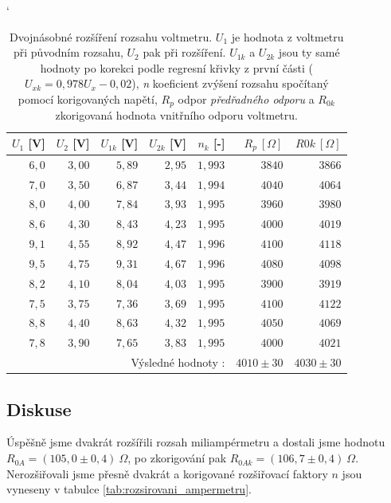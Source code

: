 \documentclass[english]{article}
\begin{document}
\begin{table}[h]
\catcode` %
\begin{center}
\begin{tabular}{|r|r|r|r|r|r|r|}
\hline
     $U_1$ [V] & $U_2$ [V] & $U_{1k}$ [V] & $U_{2k}$ [V] & $n_k$ [-] & $R_p\ [\Omega]$  & $R0k\ [\Omega]$  \\ \hline
     $6,0$ & $3,00$ & $5,89$ & $2,95$ & $1,993$ & $3840$ & $3866$ \\ \hline
     $7,0$ & $3,50$ & $6,87$ & $3,44$ & $1,994$ & $4040$ & $4064$ \\ \hline
     $8,0$ & $4,00$ & $7,84$ & $3,93$ & $1,995$ & $3960$ & $3980$ \\ \hline
     $8,6$ & $4,30$ & $8,43$ & $4,23$ & $1,995$ & $4000$ & $4019$ \\ \hline
     $9,1$ & $4,55$ & $8,92$ & $4,47$ & $1,996$ & $4100$ & $4118$ \\ \hline
     $9,5$ & $4,75$ & $9,31$ & $4,67$ & $1,996$ & $4080$ & $4098$ \\ \hline
     $8,2$ & $4,10$ & $8,04$ & $4,03$ & $1,995$ & $3900$ & $3919$ \\ \hline
     $7,5$ & $3,75$ & $7,36$ & $3,69$ & $1,995$ & $4100$ & $4122$ \\ \hline
     $8,8$ & $4,40$ & $8,63$ & $4,32$ & $1,995$ & $4050$ & $4069$ \\ \hline
     $7,8$ & $3,90$ & $7,65$ & $3,83$ & $1,995$ & $4000$ & $4021$ \\ \hline
      
      \multicolumn{2}{r|}{} & \multicolumn{3}{|r|}{Výsledné hodnoty \cite{bib:pra_chyby_o_2}:}  & $4010 \pm 30$  & $4030 \pm 30$ \\ 
      \cline{3-7} %
      
\end{tabular}
\caption{Dvojnásobné rozšíření rozsahu voltmetru. $U_1$ je hodnota z voltmetru při původním rozsahu, $U_2$ pak při rozšíření. $U_{1k}$ a $U_{2k}$ jsou ty samé hodnoty po korekci podle regresní křivky z první části ($U_{xk} = 0,978 U_x - 0,02$), \emph{n} koeficient zvýšení rozsahu spočítaný pomocí korigovaných napětí, $R_p$ odpor \emph{předřadného odporu} a $R_{0k}$ zkorigovaná hodnota vnitřního odporu voltmetru.} 
\label{tab:rozsirovani_voltmetru}
\end{center}
\end{table}

\subsection{Diskuse}
Úspěšně jsme dvakrát rozšířili rozsah miliampérmetru a dostali jsme hodnotu $R_{0A} = (105,0 \pm 0,4)\ \Omega$, po zkorigování pak $R_{0Ak} = (106,7 \pm 0,4)\ \Omega$. Nerozšiřovali jsme přesně dvakrát a korigované rozšiřovací faktory $n$ jsou vyneseny v tabulce \ref{tab:rozsirovani_ampermetru}.
\end{document}
